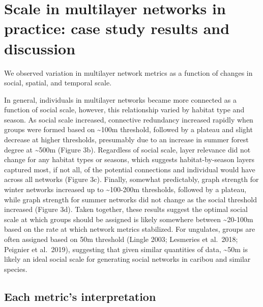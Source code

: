 \documentclass[]{article}
\begin{document}
\hypertarget{scale-in-multilayer-networks-in-practice-case-study-results-and-discussion}{%
\section{Scale in multilayer networks in practice: case study results and discussion}\label{scale-in-multilayer-networks-in-practice-case-study-results-and-discussion}}

We observed variation in multilayer network metrics as a function of changes in social, spatial, and temporal scale.

In general, individuals in multilayer networks became more connected as a function of social scale, however, this relationship varied by habitat type and season. As social scale increased, connective redundancy increased rapidly when groups were formed based on \textasciitilde{}100m threshold, followed by a plateau and slight decrease at higher thresholds, presumably due to an increase in summer forest degree at \textasciitilde{}500m (Figure 3b). Regardless of social scale, layer relevance did not change for any habitat types or seasons, which suggests habitat-by-season layers captured most, if not all, of the potential connections and individual would have across all networks (Figure 3c). Finally, somewhat predictably, graph strength for winter networks increased up to \textasciitilde{}100-200m thresholds, followed by a plateau, while graph strength for summer networks did not change as the social threshold increased (Figure 3d). Taken together, these results suggest the optimal social scale at which groups should be assigned is likely somewhere between \textasciitilde{}20-100m based on the rate at which network metrics stabilized. For ungulates, groups are often assigned based on 50m threshold (Lingle 2003; Lesmeries et al.~2018; Peignier et al.~2019), suggesting that given similar quantities of data, \textasciitilde{}50m is likely an ideal social scale for generating social networks in caribou and similar species.

\hypertarget{each-metrics-interpretation}{%
\subsection{Each metric's interpretation}\label{each-metrics-interpretation}}
\end{document}
